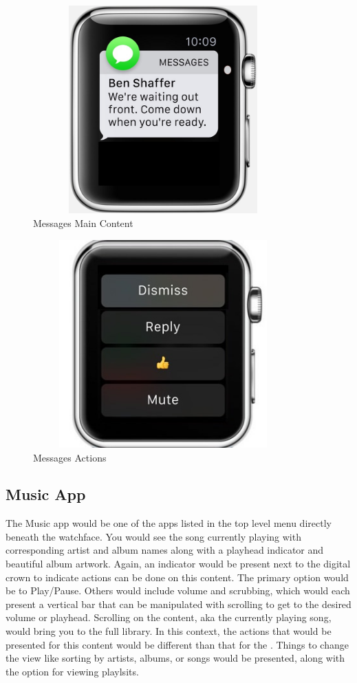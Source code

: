 \documentclass[journal,letterpaper]{article}
\begin{document}
    \begin{figure}[htbp]
        \centering
        \includegraphics[width=10cm,height=8cm,keepaspectratio]{messages}
        \caption{Messages Main Content}
        \label{fig:messages}
    \end{figure}

    \begin{figure}[htbp]
        \centering
        \includegraphics[width=10cm,height=8cm,keepaspectratio]{messages-actions}
        \caption{Messages Actions}
        \label{fig:messages_actions}
    \end{figure}

    \subsection{Music App}

    The Music app would be one of the apps listed in the top level menu directly beneath the watchface. You would see the song currently playing with corresponding artist and album names along with a playhead indicator and beautiful album artwork. Again, an indicator would be present next to the digital crown to indicate actions can be done on this content. The primary option would be to Play/Pause. Others would include volume and scrubbing, which would each present a vertical bar that can be manipulated with scrolling to get to the desired volume or playhead. Scrolling on the content, aka the currently playing song, would bring you to the full library. In this context, the actions that would be presented for this content would be different than that for the . Things to change the view like sorting by artists, albums, or songs would be presented, along with the option for viewing playlsits.
\end{document}
